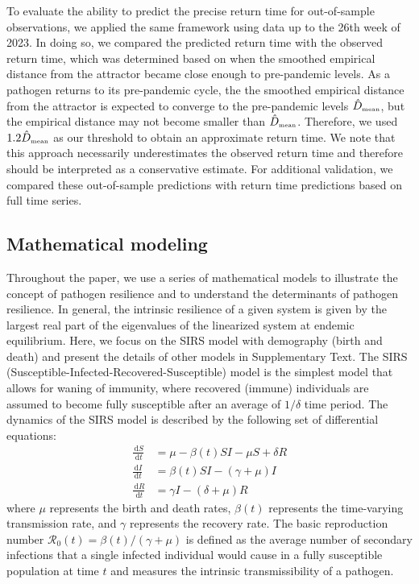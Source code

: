 \documentclass[12pt]{article}
\newcommand{\tsub}[2]{#1_{{\textrm{\tiny #2}}}}
\newcommand{\dd}[1]{\ensuremath{\, \mathrm{d}#1}}
\begin{document}
To evaluate the ability to predict the precise return time for out-of-sample observations, we applied the same framework using data up to the 26th week of 2023.
In doing so, we compared the predicted return time with the observed return time, which was determined based on when the smoothed empirical distance from the attractor became close enough to pre-pandemic levels.
As a pathogen returns to its pre-pandemic cycle, the the smoothed empirical distance from the attractor is expected to converge to the pre-pandemic levels $\tsub{\hat{D}}{mean}$, but the empirical distance may not become smaller than $\tsub{\hat{D}}{mean}$.
Therefore, we used $1.2 \tsub{\hat{D}}{mean}$ as our threshold to obtain an approximate return time.
We note that this approach necessarily underestimates the observed return time and therefore should be interpreted as a conservative estimate.
For additional validation, we compared these out-of-sample predictions with return time predictions based on full time series.

\subsection*{Mathematical modeling}

Throughout the paper, we use a series of mathematical models to illustrate the concept of pathogen resilience and to understand the determinants of pathogen resilience.
In general, the intrinsic resilience of a given system is given by the largest real part of the eigenvalues of the linearized system at endemic equilibrium.
Here, we focus on the SIRS model with demography (birth and death) and present the details of other models in Supplementary Text.
The SIRS (Susceptible-Infected-Recovered-Susceptible) model is the simplest model that allows for waning of immunity, where recovered (immune) individuals are assumed to become fully susceptible after an average of $1/\delta$ time period.
The dynamics of the SIRS model is described by the following set of differential equations:
\begin{align}
\frac{\dd S}{\dd t} &= \mu - \beta(t) SI - \mu S + \delta R \\
\frac{\dd I}{\dd t} &= \beta(t) SI - (\gamma + \mu) I \\
\frac{\dd R}{\dd t} &= \gamma I - (\delta + \mu) R
\end{align}
where $\mu$ represents the birth and death rates, $\beta(t)$ represents the time-varying transmission rate, and $\gamma$ represents the recovery rate.
The basic reproduction number $\mathcal R_0(t) = \beta(t)/(\gamma + \mu)$ is defined as the average number of secondary infections that a single infected individual would cause in a fully susceptible population at time $t$ and measures the intrinsic transmissibility of a pathogen.
\end{document}
